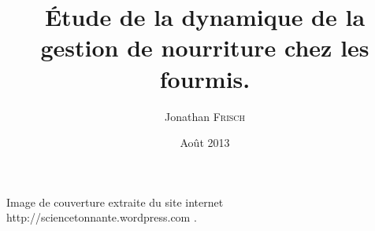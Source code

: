 \documentclass[a4paper,oneside]{memoir}
\title{Étude de la dynamique de la gestion de nourriture chez les fourmis.}
\date{Août 2013}
\author{Jonathan \textsc{Frisch}}
\begin{document}


Image de couverture extraite du site internet http://sciencetonnante.wordpress.com .
\clearpage





\tableofcontents















\newpage




\clearpage


\end{document}
